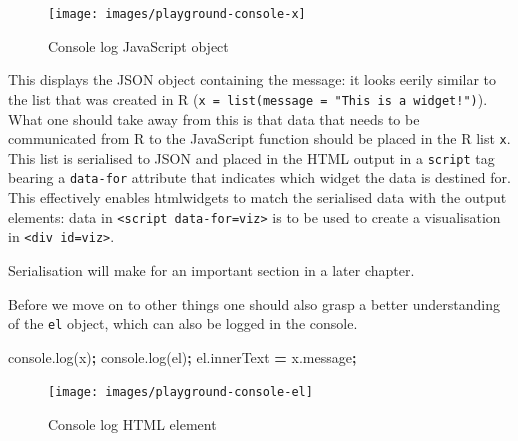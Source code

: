 \documentclass[
  10pt,
]{krantz}
\makeatletter
\newenvironment{Shaded}{\begin{snugshade}}{\end{snugshade}}
\newcommand{\AttributeTok}[1]{\textcolor[rgb]{0.61,0.61,0.61}{#1}}
\newcommand{\NormalTok}[1]{#1}
\newcommand{\OperatorTok}[1]{\textcolor[rgb]{0.43,0.43,0.43}{\textbf{#1}}}
\newcommand{\VariableTok}[1]{\textcolor[rgb]{0,0,0}{#1}}
\newenvironment{kframe}{%
\medskip{}
\setlength{\fboxsep}{.8em}
 \def\at@end@of@kframe{}%
 \ifinner\ifhmode%
  \def\at@end@of@kframe{\end{minipage}}%
  \begin{minipage}{\columnwidth}%
 \fi\fi%
 \def\FrameCommand##1{\hskip\@totalleftmargin \hskip-\fboxsep
 \colorbox{shadecolor}{##1}\hskip-\fboxsep
     \hskip-\linewidth \hskip-\@totalleftmargin \hskip\columnwidth}%
 \MakeFramed {\advance\hsize-\width
   \@totalleftmargin\z@ \linewidth\hsize
   \@setminipage}}%
 {\par\unskip\endMakeFramed%
 \at@end@of@kframe}
\renewenvironment{Shaded}{\begin{kframe}}{\end{kframe}}
\newenvironment{rmdblock}[1]
  {
  \begin{itemize}
  \renewcommand{\labelitemi}{
    \raisebox{-.7\height}[0pt][0pt]{
      {\setkeys{Gin}{width=3em,keepaspectratio}\texttt{[image: images/\#1]}}
    }
  }
  \setlength{\fboxsep}{1em}
  \begin{kframe}
  \item
  }
  {
  \end{kframe}
  \end{itemize}
  }
\newenvironment{rmdnote}
  {\begin{rmdblock}{note}}
  {\end{rmdblock}}
\makeatother
\begin{document}
\begin{figure}[H]

{\centering \texttt{[image: images/playground-console-x]} 

}

\caption{Console log JavaScript object}\label{fig:playground-console}
\end{figure}

This displays the JSON object containing the message: it looks eerily similar to the list that was created in R (\texttt{x\ =\ list(message\ =\ "This\ is\ a\ widget!")}). What one should take away from this is that data that needs to be communicated from R to the JavaScript function should be placed in the R list \texttt{x}. This list is serialised to JSON and placed in the HTML output in a \texttt{script} tag bearing a \texttt{data-for} attribute that indicates which widget the data is destined for. This effectively enables htmlwidgets to match the serialised data with the output elements: data in \texttt{\textless{}script\ data-for=\textquotesingle{}viz\textquotesingle{}\textgreater{}} is to be used to create a visualisation in \texttt{\textless{}div\ id=\textquotesingle{}viz\textquotesingle{}\textgreater{}}.

\begin{rmdnote}
Serialisation will make for an important section in a later chapter.
\end{rmdnote}

Before we move on to other things one should also grasp a better understanding of the \texttt{el} object, which can also be logged in the console.

\begin{Shaded}
\begin{Highlighting}[]
\VariableTok{console}\NormalTok{.}\AttributeTok{log}\NormalTok{(x)}\OperatorTok{;}
\VariableTok{console}\NormalTok{.}\AttributeTok{log}\NormalTok{(el)}\OperatorTok{;}
\VariableTok{el}\NormalTok{.}\AttributeTok{innerText} \OperatorTok{=} \VariableTok{x}\NormalTok{.}\AttributeTok{message}\OperatorTok{;}
\end{Highlighting}
\end{Shaded}

\begin{figure}[H]

{\centering \texttt{[image: images/playground-console-el]} 

}

\caption{Console log HTML element}\label{fig:playground-console-el}
\end{figure}
\end{document}
